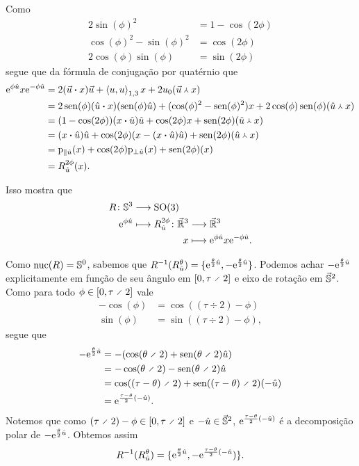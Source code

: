 Como
	\begin{align*}
	2\sin(\phi)^2 &= 1-\cos(2\phi) \\
	\cos(\phi)^2 - \sin(\phi)^2 &= \cos(2\phi) \\
	2\cos(\phi)\sin(\phi) &= \sin(2\phi)
	\end{align*}
segue que da fórmula de conjugação por quatérnio que
	\begin{align*}
	\e^{\phi \hat{u}}x\e^{-\phi \hat{u}} &= 2(\pesc{\vec{u}}{x})\vec{u} + \inteq{u}{u}x + 2\esc{u}(\pvec{\vec{u}}{x}) \\
		&= 2\sin(\phi)(\pesc{\hat{u}}{x})(\sin(\phi)\hat{u}) + (\cos(\phi)^2-\sin(\phi)^2)x + 2\cos(\phi)\sin(\phi)(\pvec{\hat{u}}{x}) \\
		&= (1-\cos(2\phi))(\pesc{x}{\hat{u}})\hat{u} + \cos(2\phi)x + \sin(2\phi)(\pvec{\hat{u}}{x}) \\
		&= (\pesc{x}{\hat{u}})\hat{u} + \cos(2\phi)(x-(\pesc{x}{\hat{u}})\hat{u}) + \sin(2\phi)(\pvec{\hat{u}}{x}) \\
		&= \proj_{\parallel \hat{u}}(x) + \cos(2\phi)\proj_{\perp \hat{u}}(x) + \sin(2\phi)(x) \\
		&= R^{2\phi}_{\hat{u}}(x).
	\end{align*}

Isso mostra que
	\begin{align*}
	\func{R}{\S^3}{\SO(3)}{\e^{\phi \hat{u}}}{
		\begin{aligned}[t]
		\func{R^{2\phi}_{\hat{u}}}{\vec{\R}^3}{\vec{\R}^3}{x}{\e^{\phi \hat{u}}x\e^{-\phi \hat{u}}}.
		\end{aligned}
	}
	\end{align*}

Como $\nuc(R) = \S^0$, sabemos que $R\inv(R^{\theta}_{\hat{u}}) = \{\e^{\frac{\theta}{2}\hat{u}},-\e^{\frac{\theta}{2}\hat{u}}\}$. Podemos achar $-\e^{\frac{\theta}{2}\hat{u}}$ explicitamente em função de seu ângulo em $\intff{0}{\tau \div 2}$ e eixo de rotação em $\vec{\S}^2$. Como para todo $\phi \in \intff{0}{\tau \div 2}$ vale
	\begin{align*}
	-\cos(\phi) &= \cos((\tau \div 2) - \phi) \\
	\sin(\phi) &= \sin((\tau \div 2) - \phi),
	\end{align*}
segue que
	\begin{align*}
	-\e^{\frac{\theta}{2}\hat{u}} &= -(\cos(\theta \div 2) + \sin(\theta \div 2) \hat{u}) \\
		&= -\cos(\theta \div 2) - \sin(\theta \div 2) \hat{u} \\
		&= \cos((\tau-\theta) \div 2) + \sin((\tau - \theta) \div 2)(-\hat{u}) \\
		&= \e^{\frac{\tau - \theta}{2}(-\hat{u})}.
	\end{align*}
Notemos que como $(\tau \div 2) - \phi \in \intff{0}{\tau \div 2}$ e $-\hat{u} \in \vec{\S}^2$, $\e^{\frac{\tau - \theta}{2}(-\hat{u})}$ é a decomposição polar de $-\e^{\frac{\theta}{2}\hat{u}}$. Obtemos assim
	\begin{equation*}
	R\inv(R^{\theta}_{\hat{u}}) = \{\e^{\frac{\theta}{2}\hat{u}},-\e^{\frac{\tau - \theta}{2}(-\hat{u}})\}.
	\end{equation*}

